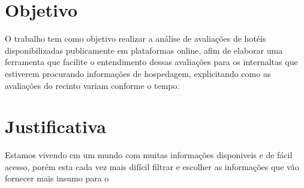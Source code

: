 \section{Objetivo}

O trabalho tem como objetivo realizar a análise de avaliações de hotéis disponibilizadas publicamente em plataformas online, afim de elaborar uma ferramenta que facilite o entendimento dessas avaliações para os internaltas que estiverem procurando informações de hospedagem, explicitando como as avaliações do recinto variam conforme o tempo.

\begin{comment}
    como o sentimento dos usuários que avaliaram o estabelecimento variou durante o tempo, se o recinto está recebendo avaliações com sentimentos mais positivos ou se a tendência é de que as avaliações continuem com sentimentos cada vez mais negativos, e identificiar possíveis mudanças de comportamento, que para esses cenários podem ser justificados por mudanças de equipe, mudanças de políticas internas da empresa ou por uma simples manutenção ou evolução das instalações
    , afim de observar e entender as variações de sentimentos das avaliações realizadas pelos usuários da plataforma distribuidos durante o tempo.
\end{comment}

\section{Justificativa}

Estamos vivendo em um mundo com muitas informações disponiveis e de fácil acesso, porém esta cada vez mais difícil filtrar e escolher as informações que vão fornecer mais insumo para o 